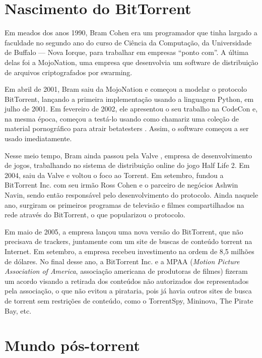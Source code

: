 \section{Nascimento do BitTorrent}

Em meados dos anos 1990, Bram Cohen era um programador que tinha largado a faculdade no
segundo ano do curso de Ciência da Computação, da Universidade de Buffalo --- Nova
Iorque, para trabalhar em empresas ``ponto com''. A última delas foi a MojoNation, uma
empresa que desenvolvia um software de distribuição de arquivos criptografados por
\gls*{swarming}.

Em abril de 2001, Bram saiu da MojoNation e começou a modelar o protocolo BitTorrent,
lançando a primeira implementação usando a linguagem Python, em julho de 2001. Em
fevereiro de 2002, ele apresentou o seu trabalho na CodeCon \cite{site:codecon} e, na
mesma época, começou a testá-lo usando como chamariz uma coleção de material
pornográfico para atrair \glspl{betatester} \cite{site:bramcohen}. Assim, o software
começou a ser usado imediatamente.

Nesse meio tempo, Bram ainda passou pela Valve \cite{wiki:bramcohen}, empresa de
desenvolvimento de jogos, trabalhando no sistema de distribuição online do jogo Half
Life 2. Em 2004, saiu da Valve e voltou o foco ao Torrent. Em setembro, fundou a
BitTorrent Inc. com seu irmão Ross Cohen e o parceiro de negócios Ashwin Navin, sendo
então responsável pelo desenvolvimento do protocolo. Ainda naquele ano, surgiram os
primeiros programas de televisão e filmes compartilhados na rede através do BitTorrent,
o que popularizou o protocolo.

Em maio de 2005, a empresa lançou uma nova versão do BitTorrent, que não precisava de
\glspl{tracker}, juntamente com um site de buscas de conteúdo torrent na Internet. Em
setembro, a empresa recebeu investimento na ordem de 8,5 milhões de dólares. No final
desse ano, a BitTorrent Inc. e a MPAA (\emph{Motion Picture Association of America},
associação americana de produtoras de filmes) fizeram um acordo
\cite{wiki:mpaa,site:torrent-mpaa} visando a retirada dos conteúdos não autorizados dos
representados pela associação, o que não evitou a pirataria, pois já havia outros sites
de busca de torrent sem restrições de conteúdo, como o TorrentSpy, Mininova, The Pirate
Bay, etc.

\section{Mundo pós-torrent}


